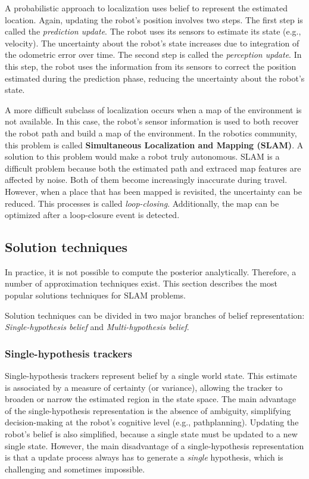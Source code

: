A probabilistic approach to localization uses belief to represent the estimated location.
Again, updating the robot's position involves two steps.
The first step is called the \textit{prediction update}. The robot uses its sensors to estimate its state (e.g., velocity). The uncertainty about the robot's state increases due to integration of the odometric error over time.
The second step is called the \textit{perception update}.  
In this step, the robot uses the information from its sensors to correct the position estimated during the prediction phase, reducing the uncertainty about the robot's state.

A more difficult subclass of localization occurs when a map of the environment is not available.
In this case, the robot's sensor information is used to both recover the robot path and build a map of the environment.
In the robotics community, this problem is called \textbf{Simultaneous Localization and Mapping (SLAM)}.
A solution to this problem would make a robot truly autonomous.
SLAM is a difficult problem because both the estimated path and extraced map features are affected by noise.
Both of them become increasingly inaccurate during travel.
However, when a place that has been mapped is revisited, the uncertainty can be reduced.
This processes is called \textit{loop-closing}.
Additionally, the map can be optimized after a loop-closure event is detected.


\subsection{Solution techniques}
\label{sec:background-solution-techniques}
In practice, it is not possible to compute the posterior analytically.
Therefore, a number of approximation techniques exist. 
This section describes the most popular solutions techniques for SLAM problems.

Solution techniques can be divided in two major branches of belief representation: \textit{Single-hypothesis belief} and \textit{Multi-hypothesis belief}.


\subsubsection{Single-hypothesis trackers}
Single-hypothesis trackers represent belief by a single world state.
This estimate is associated by a measure of certainty (or variance), allowing the tracker to broaden or narrow the estimated region in the state space.
The main advantage of the single-hypothesis representation is the absence of ambiguity, simplifying decision-making at the robot's cognitive level (e.g., pathplanning).
Updating the robot's belief is also simplified, because a single state must be updated to a new single state.
However, the main disadvantage of a single-hypothesis representation is that a update process always has to generate a \textit{single} hypothesis, which is challenging and sometimes impossible.

